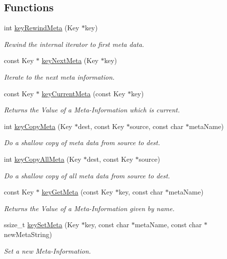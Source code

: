 \subsection*{Functions}
\begin{DoxyCompactItemize}
\item 
int \hyperlink{group__keymeta_ga5dbb669802eea27e106ee3a5e39717a9}{key\-Rewind\-Meta} (Key $\ast$key)
\begin{DoxyCompactList}\small\item\em Rewind the internal iterator to first meta data. \end{DoxyCompactList}\item 
const Key $\ast$ \hyperlink{group__keymeta_ga4c88342f580a4291455a801af71ce048}{key\-Next\-Meta} (Key $\ast$key)
\begin{DoxyCompactList}\small\item\em Iterate to the next meta information. \end{DoxyCompactList}\item 
const Key $\ast$ \hyperlink{group__keymeta_ga74a273f529030f4947df52e14fdd2869}{key\-Current\-Meta} (const Key $\ast$key)
\begin{DoxyCompactList}\small\item\em Returns the Value of a Meta-\/\-Information which is current. \end{DoxyCompactList}\item 
int \hyperlink{group__keymeta_ga9a22b992478e613c8788bd460b4a1f0c}{key\-Copy\-Meta} (Key $\ast$dest, const Key $\ast$source, const char $\ast$meta\-Name)
\begin{DoxyCompactList}\small\item\em Do a shallow copy of meta data from source to dest. \end{DoxyCompactList}\item 
int \hyperlink{group__keymeta_ga8e63720a65610a29597494d0671f9401}{key\-Copy\-All\-Meta} (Key $\ast$dest, const Key $\ast$source)
\begin{DoxyCompactList}\small\item\em Do a shallow copy of all meta data from source to dest. \end{DoxyCompactList}\item 
const Key $\ast$ \hyperlink{group__keymeta_ga9ed3875495ddb3d8a8d29158a60a147c}{key\-Get\-Meta} (const Key $\ast$key, const char $\ast$meta\-Name)
\begin{DoxyCompactList}\small\item\em Returns the Value of a Meta-\/\-Information given by name. \end{DoxyCompactList}\item 
ssize\-\_\-t \hyperlink{group__keymeta_gae1f15546b234ffb6007d8a31178652b9}{key\-Set\-Meta} (Key $\ast$key, const char $\ast$meta\-Name, const char $\ast$new\-Meta\-String)
\begin{DoxyCompactList}\small\item\em Set a new Meta-\/\-Information. \end{DoxyCompactList}\end{DoxyCompactItemize}


